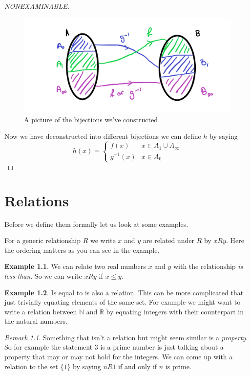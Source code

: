 \documentclass[
]{book}
\theoremstyle{definition}
\theoremstyle{definition}
\newtheorem{example}{Example}[chapter]
\theoremstyle{definition}
\theoremstyle{definition}
\theoremstyle{remark}
\newtheorem*{remark}{Remark}
\begin{document}
\begin{proof}[NONEXAMINABLE]
\begin{figure}
\centering
\includegraphics{CBS3.png}
\caption{\label{fig:unnamed-chunk-23}A picture of the bijections we've constructed}
\end{figure}

Now we have deconstructed into different bijections we can define \(h\) by saying
\[ h(x) = \left\{ \begin{array}{cr} f(x) & x \in A_1 \cup A_\infty\\ g^{-1}(x) & x \in A_0 \end{array} \right.  \]
\end{proof}

\chapter{Relations}\label{relations}

Before we define them formally let us look at some examples.

For a generic relationship \(R\) we write \(x\) and \(y\) are related under \(R\) by \(x R y\). Here the ordering matters as you can see in the example.

\begin{example}
We can relate two real numbers \(x\) and \(y\) with the relationship \emph{is less than}. So we can write \(xR y\) if \(x \leq y\).
\end{example}

\begin{example}
Is equal to is also a relation. This can be more complicated that just trivially equating elements of the same set. For example we might want to write a relation between \(\mathbb{N}\) and \(\mathbb{R}\) by equating integers with their counterpart in the natural numbers.
\end{example}

\begin{remark}
Something that isn't a relation but might seem similar is a \emph{property}. So for example the statement \(3\) is a prime number is just talking about a property that may or may not hold for the integers. We can come up with a relation to the set \(\{1\}\) by saying \(n R 1\) if and only if \(n\) is prime.
\end{remark}
\end{document}
